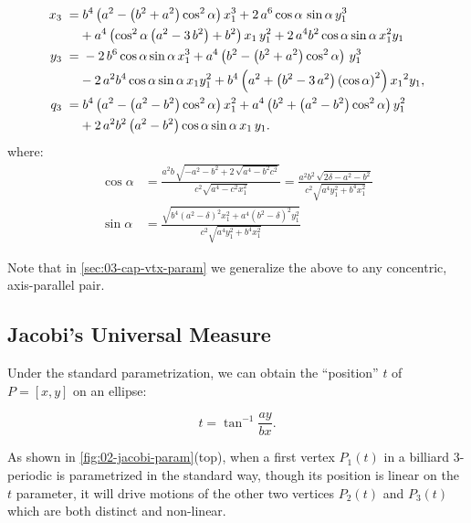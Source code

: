  \begin{equation} \label{eq:02-p3} \aligned 
x_{3}\; =& \; {b}^{4} \left( {a}^{2}- \left( {b}^{2}+{a}^{2} \right) 
 \cos^{2}\alpha\right)   x_1^{3}+2\, {a}^{6} 
 \cos \alpha\,\sin \alpha\, y_1^{3}\\
 &+{a}^{4} \left( 
  \cos^{2}  \alpha  \left( {a}^{2}-3\,{b}^{2}
 \right) +{b}^{2} \right) { x_1}\, y_1^{2}+2\,{a}^{4}{b}^{2} \cos  \alpha\sin \alpha\,   x_1^{2}{ y_1}
\\
y_{3} \;=&\; -2\, {b}^{6} \cos \alpha\sin \alpha\, x_1^{3}+
{a}^{4} \left( {b}^{2}- \left( {b}^{2}+{a}^{2} \right)   \cos^{2}  \alpha  \right)\,  y_1^{3}\\
& -2\,{a}^{2}  {b}^{4}\cos
 \alpha  \sin \alpha\,  x_1 y_1^{2}+
{b}^{4} \left( {a}^{2}+ \left( {b}^{2}-3\,{a}^{2} \right)  \left( \cos
 \alpha  \right) ^{2} \right) {{ x_1}}^{2}{ y_1},
\\
q_3 \;=& \; {b}^{4} \left( {a}^{2}- \left(a^2 -{b}^{2}  \right)   \cos^{2} \alpha   \right) x_1^{2}+{a}^{4} \left( {b}^{2}+ \left( a^2-{b}^{2}  \right)  \cos^{2} \alpha  \right)  y_1^{2}\\
&+2\,{a}^{2}{b}^{
2} \left( {a}^{2}-{b}^{2} \right) \cos \alpha \sin \alpha\, { x_1}\,{ y_1}.
\endaligned
%
\end{equation}
where:
\begin{align*}
\cos \alpha &={\frac {a^2 b  \, \sqrt {-{a}^{2}-{b}^{2}+2\,\sqrt {{a}^{4}-{b}^{2}{c}^{2}}}}{{c}^{2}\sqrt {{a}^{4}-{c}^{2} x_1^{2}}}}=
\frac{  a^2 b^2 \, \sqrt {2\delta-{a}^{2}-{b}^{2}}} {c^2\sqrt{ a^4y_1^2 + b^4x_1^2}  } \\
\sin\alpha &=\frac { 
\sqrt{{b}^{4} \left( {a}^{2}-\delta \right) ^{2}x_1^{2}+{a}^{
4} \left( {b}^{2}-\delta \right) ^{2}y_1^2}} { c^2\sqrt{  {a}^{4} y_1^{2}+{b}^{4}x_1^{2}   }  }
%
\end{align*}

Note that in \cref{sec:03-cap-vtx-param} we generalize the above to any concentric, axis-parallel pair.

\subsection{Jacobi's Universal Measure}
\label{sec:02-confocal-jacobi-param}

Under the standard parametrization, we can obtain the ``position'' $t$ of $P=[x,y]$ on an ellipse:

\[ t=\tan^{-1}{\frac{a y}{b x}}. \]

As shown in \cref{fig:02-jacobi-param}(top), when a first vertex $P_1(t)$ in a billiard 3-periodic is parametrized in the standard way, though its position is linear on the $t$ parameter, it will drive motions of the other two vertices $P_2(t)$ and $P_3(t)$ which are both distinct and non-linear. 

